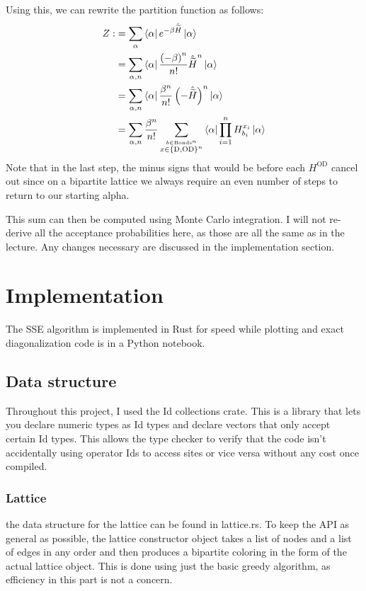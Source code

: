 \documentclass[ngerman]{scrartcl}
\begin{document}
Using this, we can rewrite the partition function as follows:
\begin{align*}
    Z:&=\sum_\alpha \bra{\alpha}e^{-\beta\hat{\widetilde{H}}}\ket{\alpha}\\
    &=\sum_{\alpha,n}\bra{\alpha}\frac{\left(-\beta\right)^n}{n!}\hat{\widetilde{H}}^n\ket{\alpha}\\
    &=\sum_{\alpha,n}\bra{\alpha}\frac{\beta^n}{n!}\left(-\hat{\widetilde{H}}\right)^n\ket{\alpha}\\
    &=\sum_{\alpha,n}\frac{\beta^n}{n!}\sum_{\overset{b\in \text{Bonds}^n}{x \in \left\{\text{D},\text{OD}\right\}^n}} \bra{\alpha} \prod_{i=1}^{n} H_{b_i}^{x_i} \ket{\alpha}
\end{align*}
Note that in the last step, the minus signs that would be before each $H^\text{OD}$ cancel out since on a bipartite lattice we always require an even number of steps to return to our starting alpha.

This sum can then be computed using Monte Carlo integration. I will not re-derive all the acceptance probabilities here, as those are all the same as in the lecture. Any changes necessary are discussed in the implementation section.

\section*{Implementation}
The SSE algorithm is implemented in Rust for speed while plotting and exact diagonalization code is in a Python notebook. 
\subsection*{Data structure}
Throughout this project, I used the Id collections crate. This is a library that lets you declare numeric types as Id types and declare vectors that only accept certain Id types. This allows the type checker to verify that the code isn't accidentally using operator Ids to access sites or vice versa without any cost once compiled.
\subsubsection*{Lattice}
the data structure for the lattice can be found in lattice.rs. To keep the API as general as possible, the lattice constructor object takes a list of nodes and a list of edges in any order and then produces a bipartite coloring in the form of the actual lattice object. This is done using just the basic greedy algorithm, as efficiency in this part is not a concern.
\end{document}
